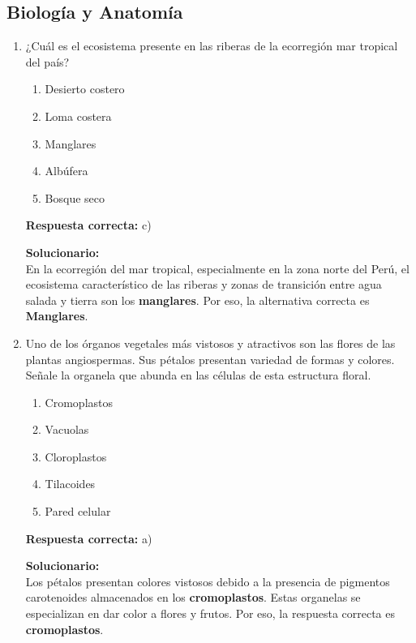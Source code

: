\subsection*{Biología y Anatomía}

\begin{enumerate}
	
	\item ¿Cuál es el ecosistema presente en las riberas de la ecorregión mar tropical del país?
	\begin{enumerate}[label=\alph*)]
		\item Desierto costero
		\item Loma costera
		\item Manglares
		\item Albúfera
		\item Bosque seco
	\end{enumerate}
	\textbf{Respuesta correcta:} c)
	
	\vspace{2mm}
	\textbf{Solucionario:}\\
	En la ecorregión del mar tropical, especialmente en la zona norte del Perú, el ecosistema característico de las riberas y zonas de transición entre agua salada y tierra son los \textbf{manglares}. Por eso, la alternativa correcta es \textbf{Manglares}.
	
	\vspace{6mm}
	
	\item Uno de los órganos vegetales más vistosos y atractivos son las flores de las plantas angiospermas. Sus pétalos presentan variedad de formas y colores. Señale la organela que abunda en las células de esta estructura floral.
	\begin{enumerate}[label=\alph*)]
		\item Cromoplastos
		\item Vacuolas
		\item Cloroplastos
		\item Tilacoides
		\item Pared celular
	\end{enumerate}
	\textbf{Respuesta correcta:} a)
	
	\vspace{2mm}
	\textbf{Solucionario:}\\
	Los pétalos presentan colores vistosos debido a la presencia de pigmentos carotenoides almacenados en los \textbf{cromoplastos}. Estas organelas se especializan en dar color a flores y frutos. Por eso, la respuesta correcta es \textbf{cromoplastos}.
	
	\vspace{6mm}
	
\end{enumerate}

